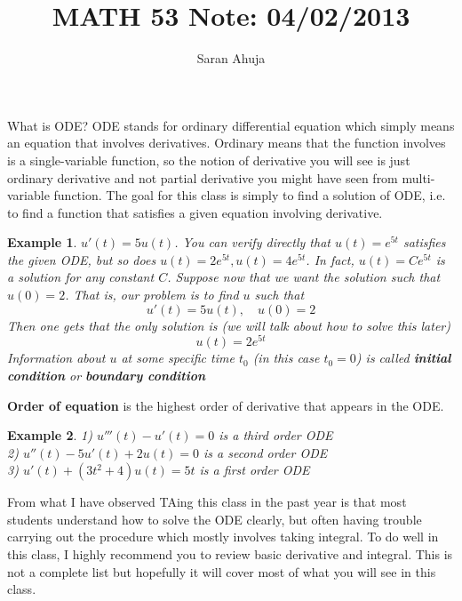 \documentclass[10pt]{amsart}
\title{MATH 53 Note: 04/02/2013}
\author{Saran Ahuja}
\newtheorem{example}{Example}
\renewcommand{\ni}{\noindent}
\newcommand{\tf}{\textbf}
\begin{document}
\maketitle

\noindent What is ODE? ODE stands for ordinary differential equation which simply means an equation that involves derivatives. Ordinary means that the function involves is a single-variable function, so the notion of derivative you will see is just ordinary derivative and not partial derivative you might have seen from multi-variable function.  The goal for this class is simply to find a solution of ODE, i.e. to find a function that satisfies a given equation involving derivative.
 
 
\begin{example} $u'(t) = 5u(t)$. You can verify directly that $u(t) = e^{5t}$ satisfies the given ODE, but so does $u(t) = 2e^{5t}, u(t) = 4e^{5t}$. In fact, $u(t) = Ce^{5t}$ is a solution for any constant $C$. Suppose now that we want the solution such that $u(0) = 2$. That is, our problem is to find $u$ such that
$$ u'(t) = 5u(t), \quad u(0) = 2 $$
Then one gets that the only solution is (we will talk about how to solve this later) 
$$ u(t) = 2e^{5t} $$
Information about $u$ at some specific time $t_{0}$ (in this case $t_{0}=0$) is called \textbf{initial condition} or \tf{boundary condition}
\end{example}

\ni\tf{Order of equation} is the highest order of derivative that appears in the ODE. 

\begin{example} 1) $u'''(t) - u'(t) = 0$ is a third order ODE \\
2) $u''(t) - 5u'(t) + 2u(t) = 0$ is a second order ODE \\
3) $u'(t) + (3t^{2}+4)u(t) = 5t$ is a first order ODE 
\end{example}

From what I have observed TAing this class in the past year is that most students understand how to solve the ODE clearly, but often having trouble carrying out the procedure which mostly involves taking integral. To do well in this class, I highly recommend you to review basic derivative and integral. This is not a complete list but hopefully it will cover most of what you will see in this class.
\end{document}

